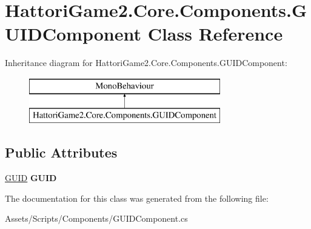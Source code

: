 \hypertarget{class_hattori_game2_1_1_core_1_1_components_1_1_g_u_i_d_component}{}\section{Hattori\+Game2.\+Core.\+Components.\+G\+U\+I\+D\+Component Class Reference}
\label{class_hattori_game2_1_1_core_1_1_components_1_1_g_u_i_d_component}
Inheritance diagram for Hattori\+Game2.\+Core.\+Components.\+G\+U\+I\+D\+Component\+:\begin{figure}[H]
\begin{center}
\leavevmode
\includegraphics[height=2.000000cm]{class_hattori_game2_1_1_core_1_1_components_1_1_g_u_i_d_component}
\end{center}
\end{figure}
\subsection*{Public Attributes}
\begin{DoxyCompactItemize}
\item 
\hypertarget{class_hattori_game2_1_1_core_1_1_components_1_1_g_u_i_d_component_ac84da292cf24255cd912e4a6b38522ea}{}\hyperlink{struct_hattori_game2_1_1_core_1_1_g_u_i_d}{G\+U\+I\+D} {\bfseries G\+U\+I\+D}\label{class_hattori_game2_1_1_core_1_1_components_1_1_g_u_i_d_component_ac84da292cf24255cd912e4a6b38522ea}

\end{DoxyCompactItemize}


The documentation for this class was generated from the following file\+:\begin{DoxyCompactItemize}
\item 
Assets/\+Scripts/\+Components/G\+U\+I\+D\+Component.\+cs\end{DoxyCompactItemize}
